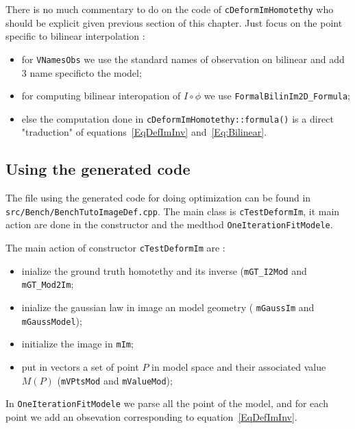 There is no much commentary to do on the code of {\tt cDeformImHomotethy} who
should be explicit given previous section of this chapter.
Just focus on the point specific to bilinear interpolation :

\begin{itemize}
	\item for {\tt VNamesObs} we use the standard names of observation on bilinear 
              and add $3$ name specificto the model;

      \item for computing bilinear interopation of $I \circ \phi$ we use {\tt FormalBilinIm2D\_Formula};

      \item else the computation done in {\tt cDeformImHomotethy::formula()} is a direct "traduction"
	      of equations~\ref{EqDefImInv} and~\ref{Eq:Bilinear}.

\end{itemize}


\subsection{Using the generated code}

The file using the generated code for doing optimization can be found in 
{\tt src/Bench/BenchTutoImageDef.cpp}.  The main class is {\tt cTestDeformIm},
it main action are done in the constructor and the medthod {\tt OneIterationFitModele}.

The main action of constructor {\tt cTestDeformIm} are :

\begin{itemize}
    \item  inialize the ground truth homotethy and its inverse ({\tt mGT\_I2Mod} and {\tt mGT\_Mod2Im};
    \item  inialize the gaussian law in image an model geometry ( {\tt mGaussIm}  and {\tt mGaussModel});
    \item  initialize the image  in {\tt mIm}; 
    \item  put in vectors a set of point $P$ in model space and their associated value $M(P)$
           ({\tt mVPtsMod} and {\tt mValueMod});
\end{itemize}


In {\tt OneIterationFitModele} we parse all the point of the model, and for each point we
add an obsevation corresponding to equation~\ref{EqDefImInv}.


